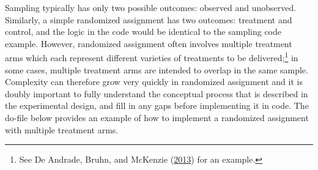 \documentclass[
]{book}
\begin{document}
Sampling typically has only two possible outcomes: observed and unobserved.
Similarly, a simple randomized assignment has two outcomes: treatment and control,
and the logic in the code would be identical to the sampling code example.
However, randomized assignment often involves multiple treatment arms
which each represent different varieties of treatments to be delivered;\footnote{See De Andrade, Bruhn, and McKenzie (\protect\hyperlink{ref-de2013helping}{2013}) for an example.}
in some cases, multiple treatment arms are intended to overlap in the same sample.
Complexity can therefore grow very quickly in randomized assignment
and it is doubly important to fully understand the conceptual process
that is described in the experimental design,
and fill in any gaps before implementing it in code.
The do-file below provides an example of how to implement
a randomized assignment with multiple treatment arms.
\end{document}
